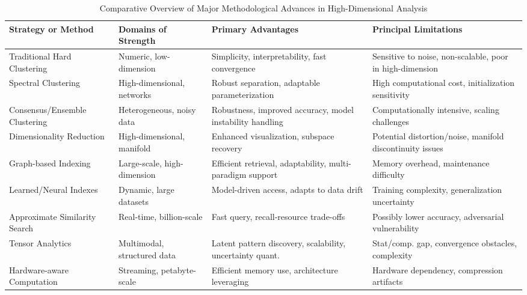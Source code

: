 \documentclass[11pt]{article}
\begin{document}
\begin{table}[ht]
\centering
\caption{Comparative Overview of Major Methodological Advances in High-Dimensional Analysis}
\label{tab:method_comparison}
\begin{tabular}{|p{3cm}|p{3cm}|p{4cm}|p{4cm}|}
\hline
\textbf{Strategy or Method} & \textbf{Domains of Strength} & \textbf{Primary Advantages} & \textbf{Principal Limitations} \\
\hline
Traditional Hard Clustering    & Numeric, low-dimension      & Simplicity, interpretability, fast convergence             & Sensitive to noise, non-scalable, poor in high-dimension \\
\hline
Spectral Clustering           & High-dimensional, networks  & Robust separation, adaptable parameterization              & High computational cost, initialization sensitivity       \\
\hline
Consensus/Ensemble Clustering & Heterogeneous, noisy data   & Robustness, improved accuracy, model instability handling  & Computationally intensive, scaling challenges             \\
\hline
Dimensionality Reduction      & High-dimensional, manifold  & Enhanced visualization, subspace recovery                  & Potential distortion/noise, manifold discontinuity issues \\
\hline
Graph-based Indexing          & Large-scale, high-dimension & Efficient retrieval, adaptability, multi-paradigm support  & Memory overhead, maintenance difficulty                   \\
\hline
Learned/Neural Indexes        & Dynamic, large datasets     & Model-driven access, adapts to data drift                  & Training complexity, generalization uncertainty           \\
\hline
Approximate Similarity Search & Real-time, billion-scale    & Fast query, recall-resource trade-offs                     & Possibly lower accuracy, adversarial vulnerability        \\
\hline
Tensor Analytics              & Multimodal, structured data & Latent pattern discovery, scalability, uncertainty quant.  & Stat/comp. gap, convergence obstacles, complexity         \\
\hline
Hardware-aware Computation    & Streaming, petabyte-scale   & Efficient memory use, architecture leveraging              & Hardware dependency, compression artifacts                \\
\hline
\end{tabular}
\end{table}
\end{document}
